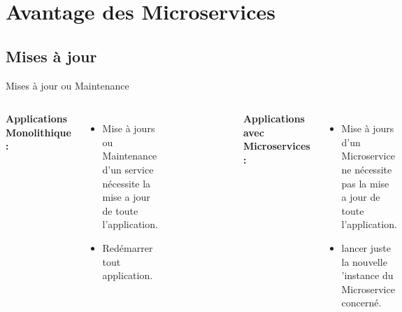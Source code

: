 \documentclass{beamer}
\begin{document}
\section{Avantage des Microservices }
\subsection{Mises à jour}
\begin{frame}{Mises à jour ou Maintenance }
    \begin{columns}
        \textbf{Applications Monolithique :} 
                \begin{itemize}
                    \item Mise à jours ou Maintenance d'un service nécessite la mise a jour de toute l'application.
                    \item Redémarrer tout application.
                \end{itemize}
        \begin{figure}
            \begin{center}
            \includegraphics[width=0.88\textwidth]{MAJmono.png}
            \end{center}
        \end{figure}
        \pause
        \textbf{Applications avec Microservices :}
         \begin{itemize}
                    \item Mise à jours d'un Microservice ne nécessite pas la mise a jour de toute l'application.
                    \item lancer juste la nouvelle 'instance du Microservice concerné.

\end{itemize}
\end{columns}
\end{frame}
\end{document}

